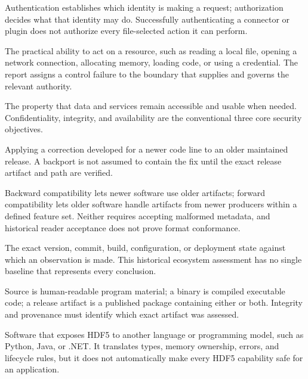 \documentclass[../main.tex]{subfiles}
\begin{document}
\begin{description}[leftmargin=1.5em,style=nextline]
\item[Authentication / authorization.]
Authentication establishes which identity is making a request; authorization
decides what that identity may do. Successfully authenticating a connector or
plugin does not authorize every file-selected action it can perform.

\item[Authority.]
The practical ability to act on a resource, such as reading a local file,
opening a network connection, allocating memory, loading code, or using a
credential. The report assigns a control failure to the boundary that supplies
and governs the relevant authority.

\item[Availability.]
The property that data and services remain accessible and usable when needed.
Confidentiality, integrity, and availability are the conventional three core
security objectives.

\item[Backport.]
Applying a correction developed for a newer code line to an older maintained
release. A backport is not assumed to contain the fix until the exact release
artifact and path are verified.

\item[Backward / forward compatibility.]
Backward compatibility lets newer software use older artifacts; forward
compatibility lets older software handle artifacts from newer producers within
a defined feature set. Neither requires accepting malformed metadata, and
historical reader acceptance does not prove format conformance.

\item[Baseline.]
The exact version, commit, build, configuration, or deployment state against
which an observation is made. This historical ecosystem assessment has no
single baseline that represents every conclusion.

\item[Binary / source / release artifact.]
Source is human-readable program material; a binary is compiled executable
code; a release artifact is a published package containing either or both.
Integrity and provenance must identify which exact artifact was assessed.

\item[Binding / wrapper.]
Software that exposes HDF5 to another language or programming model, such as
Python, Java, or .NET. It translates types, memory ownership, errors, and
lifecycle rules, but it does not automatically make every HDF5 capability safe
for an application.


\end{description}
\end{document}
